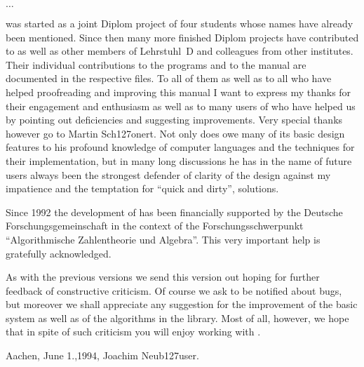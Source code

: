 $\ldots$

{\GAP} was started as a joint Diplom project of four students whose names
have    already been mentioned.  Since   then   many more finished Diplom
projects  have   contributed to {\GAP}   as  well   as other  members  of
Lehrstuhl~D and  colleagues   from other institutes.    Their  individual
contributions  to the  programs and to  the manual  are documented in the
respective  files.  To all  of  them as  well as to   all who have helped
proofreading and  improving this manual  I want to  express my thanks for
their engagement and  enthusiasm as well as  to many users of {\GAP}  who
have helped us by pointing  out deficiencies and suggesting improvements.
Very special thanks however go   to Martin Sch\accent127onert.  Not  only
does   {\GAP}  owe many of its   basic  design  features  to his profound
knowledge of     computer   languages  and   the   techniques   for their
implementation, but in many long discussions he has in the name of future
users always been the strongest defender of clarity of the design against
my impatience and the temptation for ``quick and dirty'', solutions.

Since  1992 the development of  {\GAP}  has been financially supported by
the Deutsche     Forschungsgemeinschaft    in  the   context      of  the
Forschungsschwerpunkt  ``Algorithmische Zahlentheorie   und  Algebra''.
This very important help is gratefully acknowledged.

As with the previous versions we send this version out hoping for further
feedback of constructive   criticism.  Of course  we ask  to be  notified
about bugs,  but moreover  we shall  appreciate   any suggestion  for the
improvement of the  basic  system as  well  as of  the algorithms  in the
library.  Most of all,  however, we hope that in  spite of such criticism
you will enjoy working with {\GAP}.

Aachen, June 1.,1994, \hfill Joachim Neub\accent127user.



